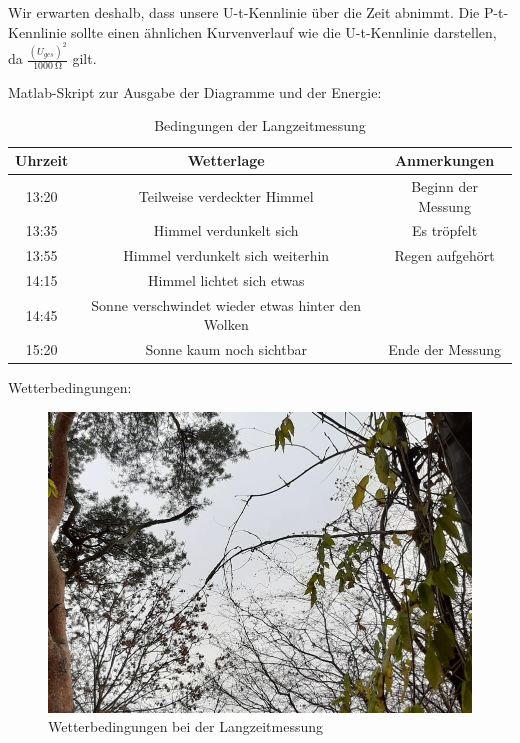 Wir erwarten deshalb, dass unsere U-t-Kennlinie über die Zeit abnimmt.
Die P-t-Kennlinie sollte einen ähnlichen Kurvenverlauf wie die U-t-Kennlinie darstellen, da $\frac{(U_{ges})^2}{\SI{1000}{\ohm}}$ gilt.

Matlab-Skript zur Ausgabe der Diagramme und der Energie:



\begin{table}[htb]
\centering
\caption{Bedingungen der Langzeitmessung}
\label{Langzeitmessung}
\begin{tabular}{c|cc}
\toprule
Uhrzeit & Wetterlage & Anmerkungen\\
\midrule
13:20 &  Teilweise verdeckter Himmel & Beginn der Messung\\
13:35 &  Himmel verdunkelt sich & Es tröpfelt\\
13:55 &  Himmel verdunkelt sich weiterhin & Regen aufgehört\\
14:15 &  Himmel lichtet sich etwas & \\
14:45 &  Sonne verschwindet wieder etwas hinter den Wolken & \\
15:20 &  Sonne kaum noch sichtbar & Ende der Messung\\
\bottomrule
\end{tabular}
\end{table}

Wetterbedingungen:

\begin{figure}[htb]
\centering
\includegraphics[width=16cm]{pictures/Dokumentation/Wetter.jpeg}
\caption{Wetterbedingungen bei der Langzeitmessung}
\label{fig:Wetter}
\end{figure}

